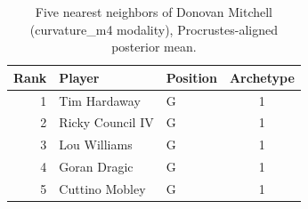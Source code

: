 \begin{table}[htbp]
  \centering\small
  \begin{tabular}{rllc}
    \toprule
    Rank & Player & Position & Archetype \\
    \midrule
    1 & Tim Hardaway & G & 1 \\
    2 & Ricky Council IV & G & 1 \\
    3 & Lou Williams & G & 1 \\
    4 & Goran Dragic & G & 1 \\
    5 & Cuttino Mobley & G & 1 \\
    \bottomrule
  \end{tabular}
  \caption{Five nearest neighbors of Donovan Mitchell (curvature_m4 modality), Procrustes-aligned posterior mean.}
  \label{tab:Donovan_Mitchell_neighbors_curvature_m4}
\end{table}

